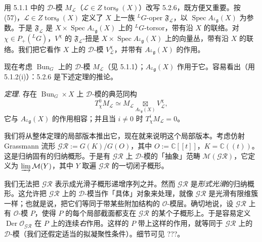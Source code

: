  用 5.1.1 中的 $\mathcal{D}$-模 $M_{\mathcal{L}}$（$\mathcal{L}\in Z\operatorname{tors}_\theta(X)$）改写 5.2.6，既方便又重要。按 (57)，$\mathcal{L}\in Z\operatorname{tors}_\theta(X)$ 定义了 $X$ 上一族 ${}^{L}G$-oper $\mathfrak{F}_{\mathcal{L}}$，以 $\operatorname{Spec}A_{{}^{L}\mathfrak{g}}(X)$ 为参数。于是 $\mathfrak{F}_{\mathcal{L}}$ 是 $X\times\operatorname{Spec}A_{{}^{L}\mathfrak{g}}(X)$ 上的 ${}^{L}G$-torsor，带有沿 $X$ 的联络。对 $\chi\in P_+({}^{L}G)$，$V^\chi$ 的 $\mathfrak{F}_{\mathcal{L}}$-扭是 $X\times\operatorname{Spec}A_{{}^{L}\mathfrak{g}}(X)$ 上的向量丛，带有沿 $X$ 的联络。我们把它看作 $X$ 上的 $\mathcal{D}$-模 $V^\chi_{\mathcal{L}}$，并带有 $A_{{}^{L}\mathfrak{g}}(X)$ 的作用。

现在考虑 $\operatorname{Bun}_G$ 上的 $\mathcal{D}$-模 $M_{\mathcal{L}}$（见 5.1.1）；$A_{{}^{L}\mathfrak{g}}(X)$ 作用于它。容易看出（用 5.1.2(i)）：5.2.6 是下述定理的推论。

 \emph{定理.} 存在 $\operatorname{Bun}_G\times X$ 上 $\mathcal{D}$-模的典范同构
\begin{equation}\tag{256}
T_\chi^0M_{\mathcal{L}}\simeq M_{\mathcal{L}}\underset{A_{{}^{L}\mathfrak{g}}(X)}{\boxtimes}V^\chi_{\mathcal{L}},
\end{equation}
它与 $A_{{}^{L}\mathfrak{g}}(X)$ 的作用相容；并且当 $i\ne 0$ 时 $T_\chi^iM_{\mathcal{L}}=0$。

 我们将从整体定理的局部版本推出它，现在就来说明这个局部版本。考虑仿射 Grassmann 流形 $\mathcal{GR}:=G(K)/G(O)$，其中 $O:=\mathbb{C}[[t]]$，$K=\mathbb{C}((t))$。这是归纳固有的归纳概形。于是有 $\mathcal{GR}$ 上 $\mathcal{D}$-模的「抽象」范畴 $\mathcal{M}(\mathcal{GR})$，它定义为 $\varinjlim\mathcal{M}(Y)$，其中 $Y$ 取遍 $\mathcal{GR}$ 的一切闭子概形。

我们无法把 $\mathcal{GR}$ 表示成光滑子概形递增序列之并。然而 $\mathcal{GR}$ 是\emph{形式光滑}的归纳概形。这允许把 $\mathcal{GR}$ 上的 $\mathcal{D}$-模当作「具体」对象来处理，就像 $\mathcal{GR}$ 是光滑有限维簇一样；也就是说，把它们等同于带某些附加结构的 $\mathcal{O}$-模层。确切地说，设 $\mathcal{GR}$ 上有 $\mathcal{O}$-模 $P$，使得 $P$ 的每个局部截面都支在 $\mathcal{GR}$ 的某个子概形上。于是容易定义 $\operatorname{Der}\mathcal{O}_{\mathcal{GR}}$ 在 $P$ 上的连续\emph{右}作用。这样的 $P$ 带上这样的作用，就等同于 $\mathcal{GR}$ 上的 $\mathcal{D}$-模（我们还假定适当的拟凝聚性条件）。细节可见 ???。

